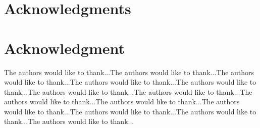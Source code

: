 \documentclass[10pt,journal,cspaper,compsoc]{IEEEtran}
\begin{document}



\ifCLASSOPTIONcompsoc
  \section*{Acknowledgments}
\else
  \section*{Acknowledgment}
\fi


The authors would like to thank...The authors would like to thank...The authors would like to thank...The authors would like to thank...The authors would like to thank...The authors would like to thank...The authors would like to thank...The authors would like to thank...The authors would like to thank...The authors would like to thank...The authors would like to thank...The authors would like to thank...The authors would like to thank...


\ifCLASSOPTIONcaptionsoff
  \newpage
\fi
\end{document}
